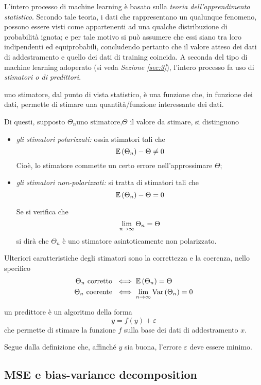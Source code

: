 \documentclass{subfiles}
\begin{document}
\label{sec:2}
L'intero processo di machine learning è basato sulla \emph{teoria dell'apprendimento statistico}.
Secondo tale teoria, i dati che rappresentano un qualunque fenomeno, possono essere visti come appartenenti ad una qualche distribuzione di probabilità ignota;
e per tale motivo si può assumere che essi siano tra loro indipendenti ed equiprobabili,
concludendo pertanto che il valore atteso dei dati di addestramento e quello dei dati di training coincida.
A seconda del tipo di machine learning adoperato (si veda \emph{Sezione \ref{sec:3}}), l'intero processo fa uso di \emph{stimatori \emph{o di} predittori}.
\begin{Definition*}
    uno stimatore, dal punto di vista statistico, è una funzione che, in funzione dei dati, permette di stimare una quantità/funzione interessante dei dati.
\end{Definition*}
Di questi, supposto $\Theta_{n} \text{uno stimatore,} \Theta$ il valore da stimare, si distinguono
\begin{itemize}
    \item \emph{gli stimatori polarizzati:} ossia stimatori tali che
          $$
              \Expected{\Theta_{n}} - \Theta \neq 0
          $$
          Cioè, lo stimatore commette un certo errore nell'approssimare $\Theta$;

    \item \emph{gli stimatori non-polarizzati:} si tratta di stimatori tali che
          $$
              \Expected{\Theta_{n}} - \Theta = 0
          $$
          \begin{Remark*}
              Se si verifica che
              $$
                  \Lim{n}{\infty}{\Theta_{n}} = \Theta
              $$
              si dirà che $\Theta_{n}$ è uno stimatore asintoticamente non polarizzato.
          \end{Remark*}
\end{itemize}
Ulteriori caratteristiche degli stimatori sono la correttezza e la coerenza, nello specifico
$$\begin{aligned}
        \Theta_{n} \text{corretto} & \iff \Expected{\Theta_{n}} = \Theta        \\
        \Theta_{n} \text{coerente} & \iff \Lim{n}{\infty}{\Var{\Theta_{n}}} = 0
    \end{aligned}$$
\begin{Definition*}
    un predittore è un algoritmo della forma
    $$
        y = f(y) + \varepsilon
    $$
    che permette di stimare la funzione $f$ sulla base dei dati di addestramento $x$.
\end{Definition*}
Segue dalla definizione che, affinché $y$ sia buona, l'errore $\varepsilon$ deve essere minimo.

\subsection{MSE e bias-variance decomposition}

\clearpage
\end{document}
